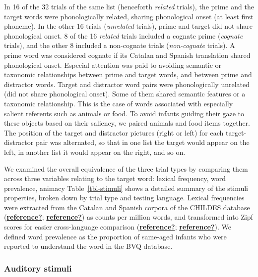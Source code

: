 \documentclass[
  letterpaper,
  DIV=11,
  numbers=noendperiod]{scrartcl}
\begin{document}
In 16 of the 32 trials of the same list (henceforth \emph{related}
trials), the prime and the target words were phonologically related,
sharing phonological onset (at least first phoneme). In the other 16
trials (\emph{unrelated} trials), prime and target did not share
phonological onset. 8 of the 16 \emph{related} trials included a cognate
prime (\emph{cognate} trials), and the other 8 included a non-cognate
trials (\emph{non-cognate} trials). A prime word was considered cognate
if its Catalan and Spanish translation shared phonological onset.
Especial attention was paid to avoiding semantic or taxonomic
relationships between prime and target words, and between prime and
distractor words. Target and distractor word pairs were phonologically
unrelated (did not share phonological onset). Some of them shared
semantic features or a taxonomic relationship. This is the case of words
associated with especially salient referents such as animals or food. To
avoid infants guiding their gaze to these objects based on their
saliency, we paired animals and food items together. The position of the
target and distractor pictures (right or left) for each
target-distractor pair was alternated, so that in one list the target
would appear on the left, in another list it would appear on the right,
and so on.

We examined the overall equivalence of the three trial types by
comparing them across three variables relating to the target word:
lexical frequency, word prevalence, animacy Table~\ref{tbl-stimuli}
shows a detailed summary of the stimuli properties, broken down by trial
type and testing language. Lexical frequencies were extracted from the
Catalan and Spanish corpora of the CHILDES database
(\protect\hyperlink{ref-reference}{\textbf{reference?}};
\protect\hyperlink{ref-reference}{\textbf{reference?}}) as counts per
million words, and transformed into Zipf scores for easier
cross-language comparison
(\protect\hyperlink{ref-reference}{\textbf{reference?}};
\protect\hyperlink{ref-reference}{\textbf{reference?}}). We defined word
prevalence as the proportion of same-aged infants who were reported to
understand the word in the BVQ database.

\hypertarget{auditory-stimuli}{%
\subsubsection{Auditory stimuli}\label{auditory-stimuli}}
\end{document}

